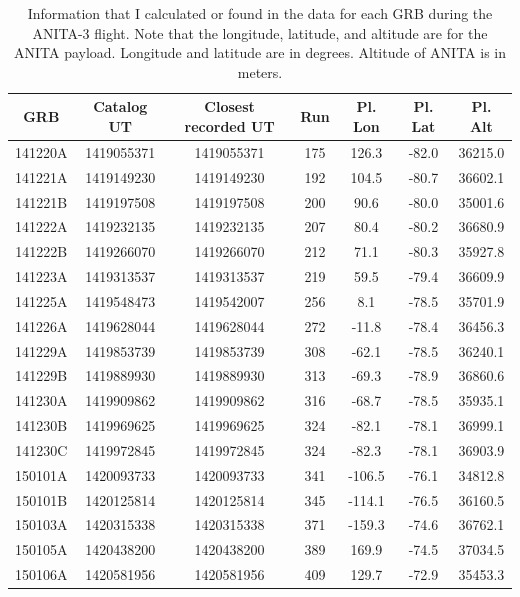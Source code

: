 \begin{table}
\centering
\begin{tabular}{ |c|c|c|c|c|c|c| } 
\hline
GRB & Catalog UT & Closest recorded UT & Run & Pl. Lon & Pl. Lat & Pl. Alt\\
\hline
141220A & 1419055371 & 1419055371 & 175 & 126.3 & -82.0 & 36215.0\\
141221A & 1419149230 & 1419149230 & 192 & 104.5 & -80.7 & 36602.1\\
141221B & 1419197508 & 1419197508 & 200 & 90.6 & -80.0 & 35001.6\\
141222A & 1419232135 & 1419232135 & 207 & 80.4 & -80.2 & 36680.9\\
141222B & 1419266070 & 1419266070 & 212 & 71.1 & -80.3 & 35927.8\\
141223A & 1419313537 & 1419313537 & 219 & 59.5 & -79.4 & 36609.9\\
141225A & 1419548473 & \color{red} {1419542007} & 256 & 8.1 & -78.5	& 35701.9\\
141226A & 1419628044 & 1419628044 & 272 & -11.8 & -78.4 & 36456.3\\
141229A & 1419853739 & 1419853739 & 308 & -62.1 & -78.5 & 36240.1\\
141229B & 1419889930 & 1419889930 & 313 & -69.3 & -78.9 & 36860.6\\
141230A & 1419909862 & 1419909862 & 316 & -68.7 & -78.5 & 35935.1\\
141230B & 1419969625 & 1419969625 & 324 & -82.1 & -78.1 & 36999.1\\
141230C & 1419972845 & 1419972845 & 324 & -82.3 & -78.1 & 36903.9\\
150101A & 1420093733 & 1420093733 & 341 & -106.5 & -76.1 & 34812.8\\
150101B & 1420125814 & 1420125814 & 345 & -114.1 & -76.5 & 36160.5\\
150103A & 1420315338 & 1420315338 & 371 & -159.3 & -74.6 & 36762.1\\
150105A & 1420438200 & 1420438200 & 389 & 169.9 & -74.5 & 37034.5\\
150106A & 1420581956 & 1420581956 & 409 & 129.7 & -72.9 & 35453.3\\
\hline
\end{tabular}
\caption{Information that I calculated or found in the data for each GRB during the ANITA-3 flight. Note that the longitude, latitude, and altitude are for the ANITA payload. Longitude and latitude are in degrees. Altitude of ANITA is in meters.}
\label{info_found}
\end{table}


